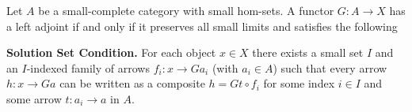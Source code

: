 Let $A$ be a small-complete category with small hom-sets. A functor $G : A \rightarrow X$ has a left adjoint if and only if it preserves all small limits and satisfies the following

\textbf{Solution Set Condition.} For each object $x \in X$ there exists a small set $I$ and an $I$-indexed family of arrows $f_i : x \rightarrow G a_i$ (with $a_i \in A$) such that every arrow $h : x \rightarrow G a$ can be written as a composite $h = G t \circ f_i$ for some index $i \in I$ and some arrow $t : a_i \rightarrow a$ in $A$.
